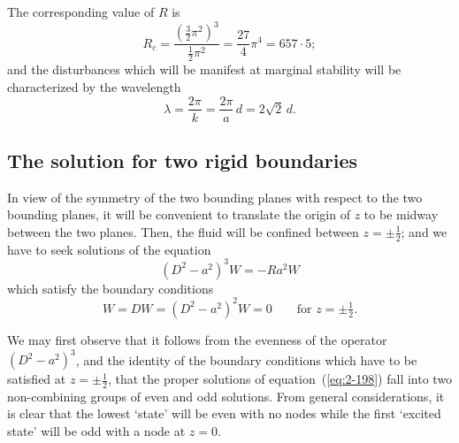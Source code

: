 The corresponding value of $R$ is
\begin{equation}
\label{eq:2-196}
R_c = \frac{(\frac{3}{2}\pi^2)^3}{\frac{1}{2}\pi^2} = \frac{27}{4}\pi^4 = 657\!\cdot\!5;
\end{equation}
and the disturbances which will be manifest at marginal stability will
be characterized by the wavelength
\begin{equation}
\label{eq:2-197}
\lambda = \frac{2\pi}{k} = \frac{2\pi}{a}\,d = 2\sqrt{2}\,d.
\end{equation}

\subsection{The solution for two rigid boundaries}\label{sec:15b}

In view of the symmetry of the two bounding planes with respect to
the two bounding planes, it will be convenient to translate the origin of $z$ to be
midway between the two planes. Then, the fluid will be confined between
$z = \pm\frac{1}{2}$; and we have to seek solutions of the equation
\begin{equation}
\label{eq:2-198}
(D^2-a^2)^3 W = -Ra^2 W
\end{equation}
which satisfy the boundary conditions
\begin{equation}
\label{eq:2-199}
W = DW = (D^2-a^2)^2 W = 0 \qquad\text{for } z = \pm\tfrac{1}{2}.
\end{equation}

We may first observe that it follows from the evenness of the operator
$(D^2-a^2)^3$, and the identity of the boundary conditions which have to be
satisfied at $z = \pm\frac{1}{2}$, that the proper solutions of equation~(\ref{eq:2-198}) fall
into two non-combining groups of even and odd solutions. From general
considerations, it is clear that the lowest `state' will be even with no nodes
while the first `excited state' will be odd with a node at $z = 0$.

